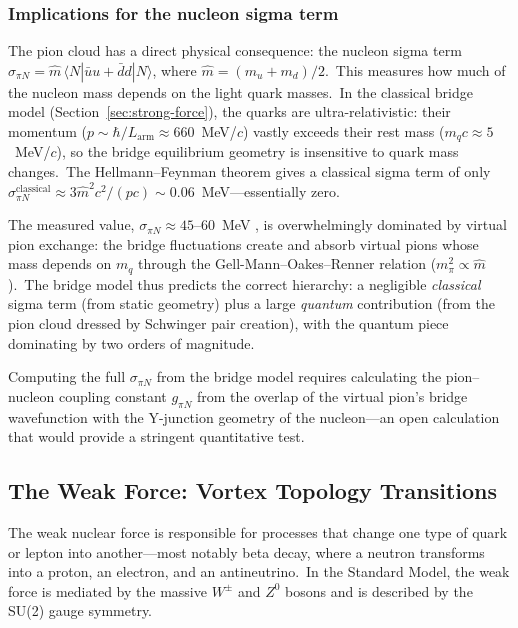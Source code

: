 ﻿\documentclass[12pt,letterpaper]{article}
\begin{document}
\subsubsection*{Implications for the nucleon sigma term}

The pion cloud has a direct physical consequence: the nucleon sigma term
$\sigma_{\pi N} = \hat{m}\,\langle N|\bar{u}u + \bar{d}d|N\rangle$,
where $\hat{m} = (m_u + m_d)/2$.\ This measures how much of the
nucleon mass depends on the light quark masses.\ In the classical bridge
model (Section~\ref{sec:strong-force}), the quarks are ultra-relativistic:
their momentum ($p \sim \hbar/L_{\mathrm{arm}} \approx 660$~MeV/$c$)
vastly exceeds their rest mass ($m_q c \approx 5$~MeV/$c$), so the
bridge equilibrium geometry is insensitive to quark mass changes.\
The Hellmann--Feynman theorem gives a classical sigma term of only
$\sigma_{\pi N}^{\mathrm{classical}} \approx 3\hat{m}^2 c^2 / (pc)
\sim 0.06$~MeV---essentially zero.

The measured value, $\sigma_{\pi N} \approx 45$--$60$~MeV
\cite{alarcon2012,hoferichter2015}, is overwhelmingly dominated by
virtual pion exchange: the bridge fluctuations create and absorb
virtual pions whose mass depends on $m_q$ through the Gell-Mann--Oakes--Renner
relation ($m_\pi^2 \propto \hat{m}$).\ The bridge model thus predicts
the correct hierarchy: a negligible \emph{classical} sigma term (from
static geometry) plus a large \emph{quantum} contribution (from the
pion cloud dressed by Schwinger pair creation), with the quantum piece
dominating by two orders of magnitude.

Computing the full $\sigma_{\pi N}$ from the bridge model requires
calculating the pion--nucleon coupling constant $g_{\pi N}$ from the
overlap of the virtual pion's bridge wavefunction with the Y-junction
geometry of the nucleon---an open calculation that would provide a
stringent quantitative test.


\subsection{The Weak Force: Vortex Topology Transitions}

The weak nuclear force is responsible for processes that change one type of quark or
lepton into another---most notably beta decay, where a neutron transforms into a proton,
an electron, and an antineutrino.\ In the Standard Model, the weak force is mediated by
the massive $W^{\pm}$ and $Z^0$ bosons and is described by the SU(2) gauge symmetry.
\end{document}
